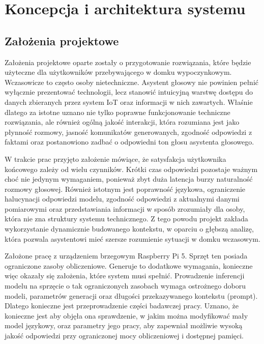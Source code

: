 \newpage
\section{Koncepcja i architektura systemu}
\label{sec:koncepcja}

\subsection{Założenia projektowe}

Założenia projektowe oparte zostały o przygotowanie rozwiązania, które będzie użyteczne dla użytkowników przebywającego w domku wypoczynkowym. Wczasowicze to często osoby nietechniczne. Asystent głosowy nie powinien pełnić wyłącznie prezentować technologii, lecz stanowić intuicyjną warstwę dostępu do danych zbieranych przez system IoT oraz informacji w nich zawartych. Właśnie dlatego za istotne uznano nie tylko poprawne funkcjonowanie techniczne rozwiązania, ale również ogólną jakość interakcji, która rozumiana jest jako płynność rozmowy, jasność komunikatów generowanych, zgodność odpowiedzi z faktami oraz postanowiono zadbać o odpowiedni ton głosu asystenta głosowego.

W trakcie prac przyjęto założenie mówiące, że satysfakcja użytkownika końcowego zależy od wielu czynników. Krótki czas odpowiedzi pozostaje ważnym choć nie jedynym wymaganiem, ponieważ zbyt duża latencja burzy naturalność rozmowy głosowej. Również istotnym jest poprawność językowa, ograniczenie halucynacji odpowiedzi modelu, zgodność odpowiedzi z aktualnymi danymi pomiarowymi oraz przedstawiania informacji w sposób zrozumiały dla osoby, która nie zna struktury systemu technicznego. Z tego powodu projekt zakłada wykorzystanie dynamicznie budowanego kontekstu, w oparciu o głębszą analizę, która pozwala asystentowi mieć szersze rozumienie sytuacji w domku wczasowym.

Założone pracę z urządzeniem brzegowym Raspberry Pi 5. Sprzęt ten posiada ograniczone zasoby obliczeniowe. Generuje to dodatkowe wymagania, konieczne więc okazały się założenia, które system musi spełnić. Prowadzenie inferencji modelu na sprzęcie o tak ograniczonych zasobach wymaga ostrożnego doboru modeli, parametrów generacji oraz długości przekazywanego kontekstu (prompt). Dlatego konieczne jest przeprowadzenie części badawczej pracy. Uznano, że konieczne jest aby objęła ona sprawdzenie, w jakim można modyfikować mały model językowy, oraz parametry jego pracy, aby zapewniał możliwie wysoką jakość odpowiedzi przy ograniczonej mocy obliczeniowej i dostępnej pamięci.

